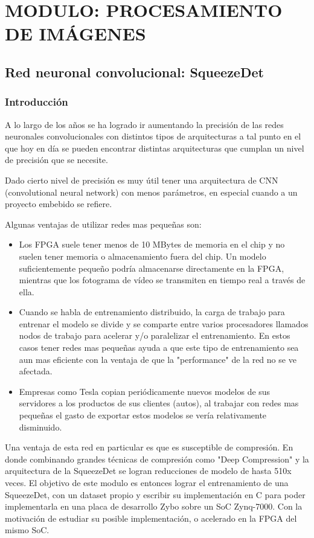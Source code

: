 \section{MODULO: PROCESAMIENTO DE IMÁGENES}

\subsection{Red neuronal convolucional: SqueezeDet}

\subsubsection{Introducción}

A lo largo de los años se ha logrado ir aumentando la precisión de las redes neuronales convolucionales con distintos tipos de arquitecturas a tal punto en el que hoy en día se pueden encontrar distintas arquitecturas que cumplan un nivel de precisión que se necesite.\par
Dado cierto nivel de precisión es muy útil tener una arquitectura de CNN (convolutional neural network) con menos parámetros, en especial cuando a un proyecto embebido se refiere.\par
\bigbreak
Algunas ventajas de utilizar redes mas pequeñas son: 
\begin{itemize}
    \item Los FPGA suele tener menos de 10 MBytes de memoria en el chip y no suelen tener memoria o almacenamiento fuera del chip. Un modelo suficientemente pequeño podría almacenarse directamente en la FPGA, mientras que los fotograma de vídeo se transmiten en tiempo real a través de ella. 
    \item Cuando se habla de entrenamiento distribuido, la carga de trabajo para entrenar el modelo se divide y se comparte entre varios procesadores llamados nodos de trabajo para acelerar y/o paralelizar el entrenamiento. En estos casos tener redes mas pequeñas ayuda a que este tipo de entrenamiento sea aun mas eficiente con la ventaja de que la "performance" de la red no se ve afectada.
    \item Empresas como Tesla copian periódicamente nuevos modelos de sus servidores a los productos de sus clientes (autos), al trabajar con redes mas pequeñas el gasto de exportar estos modelos se vería relativamente disminuido.
\end{itemize}

Una ventaja de esta red en particular es que es susceptible de compresión. En donde combinando grandes técnicas de compresión como "Deep Compression" y la arquitectura de la SqueezeDet se logran reducciones de modelo de hasta 510x veces.
\bigbreak
El objetivo de este modulo es entonces lograr el entrenamiento de una SqueezeDet, con un dataset propio y escribir su implementación en C para poder implementarla en una placa de desarrollo Zybo sobre un SoC Zynq-7000. Con la motivación de estudiar su posible implementación, o acelerado en la FPGA del mismo SoC.

